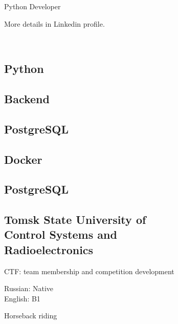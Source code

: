 \documentclass[a4paper]{MagicalCV}
\begin{document}
\lastupdated


\begin{minipage}[t]{0.33\textwidth} 


Python Developer

More details in Linkedin profile.
\sectionsep


\\


\sectionsep


\subsection{Python}
\subsection{Backend}
\subsection{PostgreSQL}
\subsection{Docker}

\subsection{PostgreSQL}


\subsection{Tomsk State University of \\ Control Systems and \\ Radioelectronics}
\vspace{\topsep} %
CTF: team membership and competition development
\sectionsep


Russian: Native\\
English: B1
\sectionsep

Horseback riding\\
\sectionsep


\end{minipage} 
\end{document}
